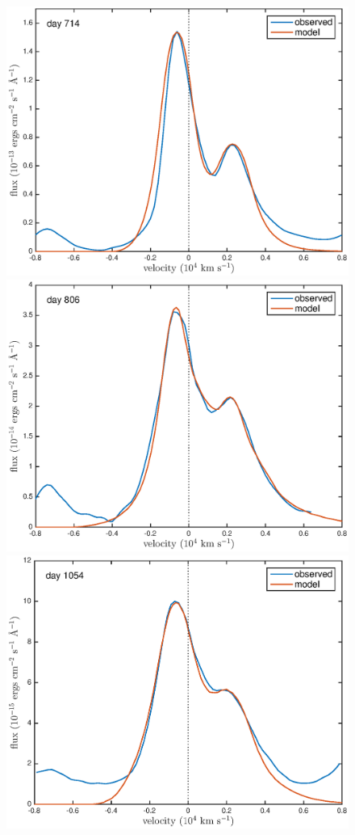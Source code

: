 \documentclass[useAMS,usenatbib,usegraphicx]{mnras}
\begin{document}
\begin{figure}
\begin{center}
\includegraphics[trim =37 10 45 15,clip=true,scale=0.41]{clump_1/best_fit/d714OI}
\includegraphics[trim =35 10 45 15,clip=true,scale=0.41]{clump_1/best_fit/d806OI}
\includegraphics[trim =37 10 45 15,clip=true,scale=0.41]{clump_1/best_fit/d1054OI}

\end{center}
\end{figure}
\end{document}
